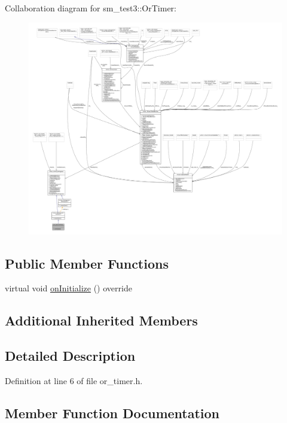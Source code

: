 Collaboration diagram for sm\+\_\+test3\+:\+:Or\+Timer\+:
\nopagebreak
\begin{figure}[H]
\begin{center}
\leavevmode
\includegraphics[width=350pt]{classsm__test3_1_1OrTimer__coll__graph}
\end{center}
\end{figure}
\subsection*{Public Member Functions}
\begin{DoxyCompactItemize}
\item 
virtual void \hyperlink{classsm__test3_1_1OrTimer_a38a0de6a293839157c6cdfa9f9da90aa}{on\+Initialize} () override
\end{DoxyCompactItemize}
\subsection*{Additional Inherited Members}


\subsection{Detailed Description}


Definition at line 6 of file or\+\_\+timer.\+h.



\subsection{Member Function Documentation}
